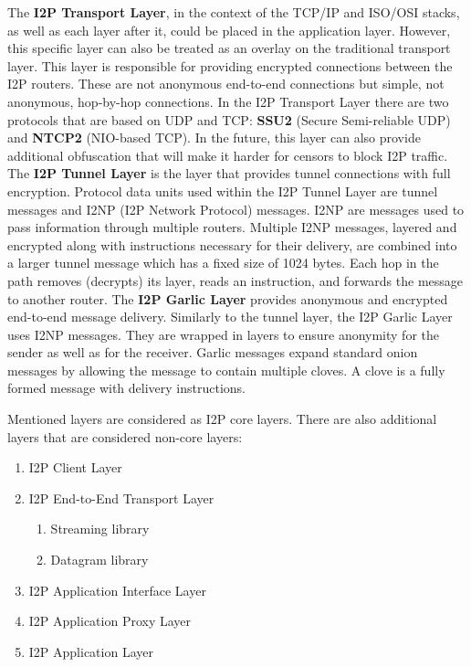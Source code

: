 The \textbf{I2P Transport Layer}, in the context of the TCP/IP and ISO/OSI stacks, as well as each layer after it, could be placed in the application layer. However, this specific layer can also be treated as an overlay on the traditional transport layer. This layer is responsible for providing encrypted connections between the I2P routers. These are not anonymous end-to-end connections but simple, not anonymous, hop-by-hop connections. In the I2P Transport Layer there are two protocols that are based on UDP and TCP: \textbf{SSU2} (Secure Semi-reliable UDP) and \textbf{NTCP2} (NIO-based TCP). In the future, this layer can also provide additional obfuscation that will make it harder for censors to block I2P traffic. The \textbf{I2P Tunnel Layer} is the layer that provides tunnel connections with full encryption. Protocol data units used within the I2P Tunnel Layer are tunnel messages and I2NP (I2P Network Protocol) messages. I2NP are messages used to pass information through multiple routers. Multiple I2NP messages, layered and encrypted along with instructions necessary for their delivery, are combined into a larger tunnel message which has a fixed size of 1024 bytes. Each hop in the path removes (decrypts) its layer, reads an instruction, and forwards the message to another router. The \textbf{I2P Garlic Layer} provides anonymous and encrypted end-to-end message delivery. Similarly to the tunnel layer, the I2P Garlic Layer uses I2NP messages. They are wrapped in layers to ensure anonymity for the sender as well as for the receiver. Garlic messages expand standard onion messages by allowing the message to contain multiple cloves. A clove is a fully formed message with delivery instructions.

Mentioned layers are considered as I2P core layers. There are also additional layers that are considered non-core layers:

\begin{enumerate}
\item I2P Client Layer
\item I2P End-to-End Transport Layer
\begin{enumerate}
\item Streaming library
\item Datagram library
\end{enumerate}
\item I2P Application Interface Layer
\item I2P Application Proxy Layer
\item I2P Application Layer
\end{enumerate}


